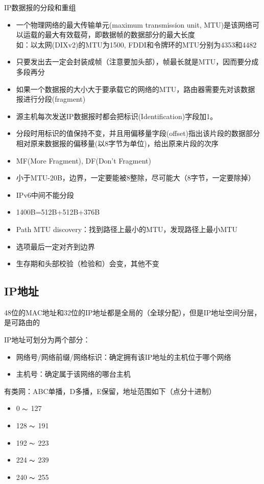 IP数据报的分段和重组
\begin{itemize}
\item 一个物理网络的最大传输单元(maximum transmission unit, MTU)是该网络可以运载的最大有效载荷，即数据帧的数据部分的最大长度\\
如：以太网(DIXv2)的MTU为1500, FDDI和令牌环的MTU分别为4353和4482
\item 只要发出去一定会封装成帧（注意要加头部），帧最长就是MTU，因而要分成多段再分
\item 如果一个数据报的大小大于要承载它的网络的MTU，路由器需要先对该数据报进行分段(fragment)
\item 源主机每次发送IP数据报时都会把标识(Identification)字段加1。
\item 分段时用标识的值保持不变，并且用偏移量字段(offset)指出该片段的数据部分相对原来数据报的偏移量(以8字节为单位)，给出原来片段的次序
\item MF(More Fragment), DF(Don't Fragment)
\item 小于MTU-20B，边界，一定要能被8整除，尽可能大（8字节，一定要除掉）
\item IPv6中间不能分段
\item 1400B=512B+512B+376B
\item Path MTU discovery：找到路径上最小的MTU，发现路径上最小MTU
\item 选项最后一定对齐到边界
\item 生存期和头部校验（检验和）会变，其他不变
\end{itemize}

\subsection{IP地址}
48位的MAC地址和32位的IP地址都是全局的（全球分配），但是IP地址空间分层，是可路由的

IP地址可划分为两个部分：
\begin{itemize}
	\item 网络号/网络前缀/网络标识：确定拥有该IP地址的主机位于哪个网络
	\item 主机号：确定属于该网络的哪台主机
\end{itemize}

有类网：ABC单播，D多播，E保留，地址范围如下（点分十进制）
\begin{itemize}
	\item 0 $\thicksim$ 127
	\item 128 $\thicksim$ 191
	\item 192 $\thicksim$ 223
	\item 224 $\thicksim$ 239
	\item 240 $\thicksim$ 255
\end{itemize}

